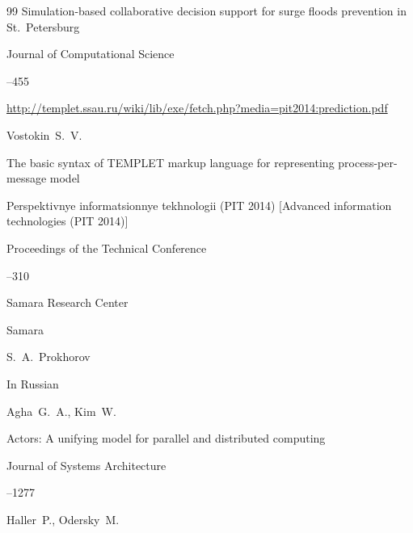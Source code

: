 \begin{thebibliography}{99}
\paper Simulation-based collaborative decision support for surge floods prevention  in St.~Petersburg 

\jour Journal of Computational Science




--455









\elink \url{http://templet.ssau.ru/wiki/lib/exe/fetch.php?media=pit2014:prediction.pdf}

\by Vostokin~S.~V.

\paper The basic syntax of TEMPLET markup language for representing process-per-message model

\inbook Perspektivnye informatsionnye tekhnologii (PIT 2014) \rm [Advanced information technologies (PIT 2014)]

\bookinfo Proceedings of the Technical Conference


--310

\publ Samara Research Center

\publaddr Samara

\ed S.~A.~Prokhorov

\lang In Russian






\by Agha~G.~A., Kim~W.

\paper Actors: A unifying model for parallel and   distributed computing


\jour Journal of   Systems Architecture




--1277










\by Haller~P., Odersky~M.


\end{thebibliography}
